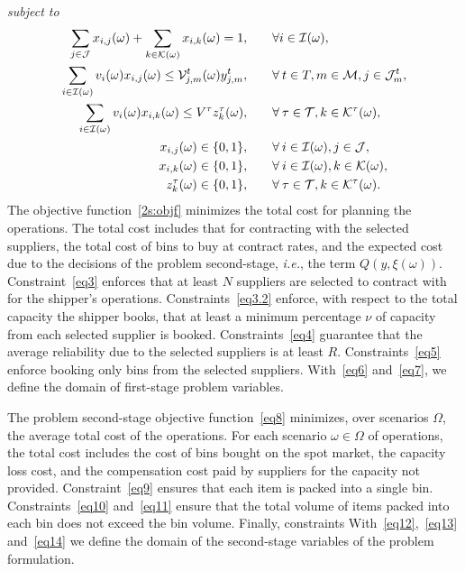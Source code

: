 \documentclass[a4paper,11pt]{article}
\begin{document}
	\noindent \textit{subject to}
	\begin{alignat}{2}
		\sum\limits_{j \in \cal J}x_{i,j}(\omega) + \sum\limits_{k \in \cal K (\omega)}x_{i,k}(\omega) = 1, & \qquad \forall i \in \cal I(\omega), \label{eq9}\\
		\sum\limits_{i \in \cal I(\omega)}v_i(\omega)x_{i,j}(\omega) \leq {\cal V}_{j,m}^t(\omega) y_{j,m}^t, & \qquad \forall \: t \in T, m\in{{\cal M}}, j \in {\cal J}^t_{m}, \label{eq10}\\
		\sum\limits_{i \in \cal I(\omega)}v_i(\omega)x_{i,k}(\omega) \leq V^\tau z^{\tau}_k(\omega), & \qquad \forall \: \tau \in {\cal T}, k \in {\cal K}^{\tau}(\omega), \label{eq11}\\
		x_{i,j}(\omega) \in \{0, 1\}, & \qquad \forall \: i \in {\cal I}(\omega), j \in {\cal J}, \label{eq12}\\
		x_{i,k}(\omega) \in \{0, 1\}, & \qquad \forall \: i \in {\cal I}(\omega), k \in \cal K(\omega), \label{eq13}\\
		z_k^{\tau}(\omega) \in \{0, 1\}, & \qquad \forall \: \tau \in {\cal T} , k \in {\cal K}^{\tau}(\omega). \label{eq14}
	\end{alignat}
	The objective function~\eqref{2s:objf} minimizes the total cost for planning the operations.
	The total cost includes that for contracting with the selected suppliers, the total cost of bins to buy at contract rates, and the expected cost due to the decisions of the problem second-stage, \textit{i.e.}, the term $Q \left(y,\xi (\omega)\right)$.
	Constraint~\eqref{eq3} enforces that at least $N$ suppliers are selected to contract with for the shipper's operations.
	Constraints~\eqref{eq3.2} enforce, with respect to the total capacity the shipper books, that at least a minimum percentage $ \nu$ of capacity from each selected supplier is booked.
	Constraints~\eqref{eq4} guarantee that the average reliability due to the selected suppliers is at least $ R$.
	Constraints~\eqref{eq5} enforce booking only bins from the selected suppliers.
	With~\eqref{eq6} and~\eqref{eq7}, we define the domain of first-stage problem variables.
	
	The problem second-stage objective function~\eqref{eq8} minimizes, over scenarios $ \Omega$, the average total cost of the operations.
	For each scenario $ \omega \in \Omega$ of operations, the total cost includes the cost of bins bought on the spot market, the capacity loss cost, and the compensation cost paid by suppliers for the capacity not provided.
	Constraint~\eqref{eq9} ensures that each item is packed into a single bin.
	Constraints~\eqref{eq10} and~\eqref{eq11} ensure that the total volume of items packed into each bin does not exceed the bin volume.
	Finally, constraints 
	With~\eqref{eq12},~\eqref{eq13} and~\eqref{eq14} we define the domain of the second-stage variables of the problem formulation.
	
\end{document}
